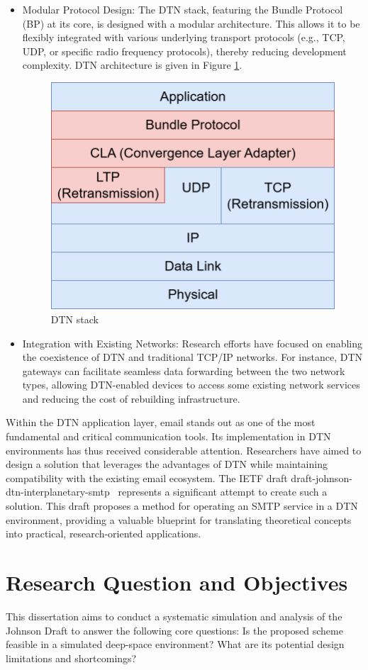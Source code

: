 \begin{itemize}
  \item Modular Protocol Design: The DTN stack, featuring the Bundle Protocol (BP) at its core, is designed with a modular architecture. This allows it to be flexibly integrated with various underlying transport protocols (e.g., TCP, UDP, or specific radio frequency protocols), thereby reducing development complexity. DTN architecture is given in Figure \ref{DTN_stack}.
  \begin{figure}[h]
      \centering
      \includegraphics[width=0.6\linewidth]{introduction/DTN_stack.png}
      \caption{DTN stack}
      \label{DTN_stack}
  \end{figure}
  \item Integration with Existing Networks: Research efforts have focused on enabling the coexistence of DTN and traditional TCP/IP networks. For instance, DTN gateways can facilitate seamless data forwarding between the two network types, allowing DTN-enabled devices to access some existing network services and reducing the cost of rebuilding infrastructure.
\end{itemize}

Within the DTN application layer, email stands out as one of the most fundamental and critical communication tools. Its implementation in DTN environments has thus received considerable attention. Researchers have aimed to design a solution that leverages the advantages of DTN while maintaining compatibility with the existing email ecosystem. The IETF draft draft-johnson-dtn-interplanetary-smtp~\cite{draft-johnson-dtn-interplanetary-smtp} represents a significant attempt to create such a solution. This draft proposes a method for operating an SMTP service in a DTN environment, providing a valuable blueprint for translating theoretical concepts into practical, research-oriented applications.

\section{Research Question and Objectives}
This dissertation aims to conduct a systematic simulation and analysis of the Johnson Draft to answer the following core questions: Is the proposed scheme feasible in a simulated deep-space environment? What are its potential design limitations and shortcomings?

